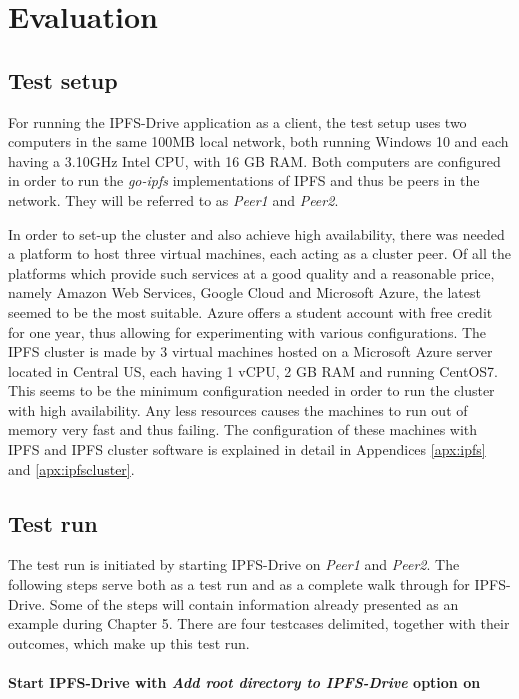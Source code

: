 \documentclass[12pt]{report}
\begin{document}
\chapter{Evaluation}

\section{Test setup}

For running the IPFS-Drive application as a client, the test setup uses two computers in the same 100MB local network, both running Windows 10 and each having a 3.10GHz Intel CPU, with 16 GB RAM.  Both computers are configured in order to run the \textit{go-ipfs} implementations of IPFS and thus be peers in the network. They will be referred to as \textit{Peer1} and \textit{Peer2}.

In order to set-up the cluster and also achieve high availability, there was needed a platform to host three virtual machines, each acting as a cluster peer. Of all the platforms which provide such services at a good quality and a reasonable price, namely Amazon Web Services, Google Cloud and Microsoft Azure, the latest seemed to be the most suitable. Azure offers a student account with free credit for one year, thus allowing for experimenting with various configurations. The IPFS cluster is made by 3 virtual machines hosted on a Microsoft Azure server located in Central US, each having 1 vCPU, 2 GB RAM and running CentOS7. This seems to be the minimum configuration needed in order to run the cluster with high availability. Any less resources causes the machines to run out of memory very fast and thus failing. The configuration of these machines with IPFS and IPFS cluster software is explained in detail in Appendices \ref{apx:ipfs} and \ref{apx:ipfscluster}.

\section{Test run}

The test run is initiated by starting IPFS-Drive on \textit{Peer1} and \textit{Peer2}. The following steps serve both as a test run and as a complete walk through for IPFS-Drive. Some of the steps will contain information already presented as an example during Chapter 5. There are four testcases delimited, together with their outcomes, which make up this test run.

\subsubsection{Start IPFS-Drive with \textit{Add root directory to IPFS-Drive} option on}
\end{document}
